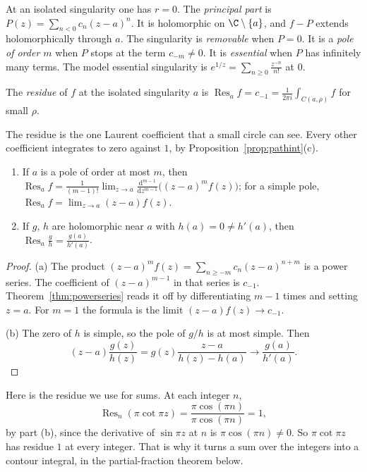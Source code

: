 At an isolated singularity one has $r=0$. The \emph{principal part} is $P(z)=\sum_{n<0}c_n(z-a)^n$. It is holomorphic on $\C\setminus\{a\}$, and $f-P$ extends holomorphically through $a$. The singularity is \emph{removable} when $P=0$. It is a \emph{pole of order $m$} when $P$ stops at the term $c_{-m}\ne0$. It is \emph{essential} when $P$ has infinitely many terms. The model essential singularity is $e^{1/z}=\sum_{n\ge0}\frac{z^{-n}}{n!}$ at $0$.

\begin{definition}
The \emph{residue} of $f$ at the isolated singularity $a$ is $\operatorname{Res}_af=c_{-1}=\frac1{2\pi i}\int_{C(a,\rho)}f$ for small $\rho$.
\end{definition}

The residue is the one Laurent coefficient that a small circle can see. Every other coefficient integrates to zero against $1$, by Proposition~\ref{prop:pathint}(c).

\begin{proposition}\label{prop:rescalc}
\begin{enumerate}[label=(\alph*)]
\item If $a$ is a pole of order at most $m$, then $\operatorname{Res}_af=\frac1{(m-1)!}\lim_{z\to a}\frac{\mathrm d^{m-1}}{\mathrm dz^{m-1}}\bigl((z-a)^mf(z)\bigr)$; for a simple pole,
$\operatorname{Res}_af=\lim_{z\to a}(z-a)f(z)$.
\item If $g$, $h$ are holomorphic near $a$ with $h(a)=0\ne h'(a)$, then $\operatorname{Res}_a\frac gh=\frac{g(a)}{h'(a)}$.
\end{enumerate}
\end{proposition}
\begin{proof}
(a) The product $(z-a)^mf(z)=\sum_{n\ge-m}c_n(z-a)^{n+m}$ is a power series. The coefficient of $(z-a)^{m-1}$ in that series is $c_{-1}$. Theorem~\ref{thm:powerseries} reads it off by differentiating $m-1$ times and setting $z=a$. For $m=1$ the formula is the limit $(z-a)f(z)\to c_{-1}$.

(b) The zero of $h$ is simple, so the pole of $g/h$ is at most simple. Then
\[
(z-a)\frac{g(z)}{h(z)}=g(z)\frac{z-a}{h(z)-h(a)}\to\frac{g(a)}{h'(a)}.
\]
\end{proof}

Here is the residue we use for sums. At each integer $n$,
\[
\operatorname{Res}_n(\pi\cot\pi z)=\frac{\pi\cos(\pi n)}{\pi\cos(\pi n)}=1,
\]
by part (b), since the derivative of $\sin\pi z$ at $n$ is $\pi\cos(\pi n)\ne0$. So $\pi\cot\pi z$ has residue $1$ at every integer. That is why it turns a sum over the integers into a contour integral, in the partial-fraction theorem below.

